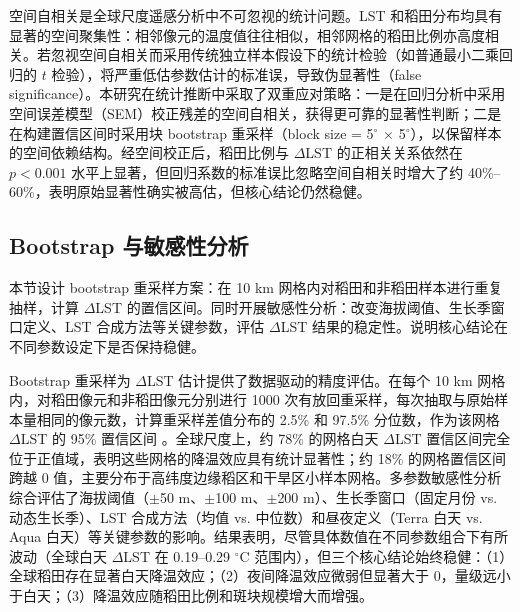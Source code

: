 空间自相关是全球尺度遥感分析中不可忽视的统计问题。LST 和稻田分布均具有显著的空间聚集性：相邻像元的温度值往往相似，相邻网格的稻田比例亦高度相关。若忽视空间自相关而采用传统独立样本假设下的统计检验（如普通最小二乘回归的 $t$ 检验），将严重低估参数估计的标准误，导致伪显著性（false significance）\cite{Weng2025}。本研究在统计推断中采取了双重应对策略：一是在回归分析中采用空间误差模型（SEM）校正残差的空间自相关，获得更可靠的显著性判断；二是在构建置信区间时采用块 bootstrap 重采样（block size = 5$^{\circ}$ $\times$ 5$^{\circ}$），以保留样本的空间依赖结构。经空间校正后，稻田比例与 $\Delta$LST 的正相关关系依然在 $p < 0.001$ 水平上显著，但回归系数的标准误比忽略空间自相关时增大了约 40\%--60\%，表明原始显著性确实被高估，但核心结论仍然稳健。

\subsection{Bootstrap 与敏感性分析}

本节设计 bootstrap 重采样方案：在 10 km 网格内对稻田和非稻田样本进行重复抽样，计算 $\Delta$LST 的置信区间。同时开展敏感性分析：改变海拔阈值、生长季窗口定义、LST 合成方法等关键参数，评估 $\Delta$LST 结果的稳定性。说明核心结论在不同参数设定下是否保持稳健。

Bootstrap 重采样为 $\Delta$LST 估计提供了数据驱动的精度评估。在每个 10 km 网格内，对稻田像元和非稻田像元分别进行 1000 次有放回重采样，每次抽取与原始样本量相同的像元数，计算重采样差值分布的 2.5\% 和 97.5\% 分位数，作为该网格 $\Delta$LST 的 95\% 置信区间 \cite{Weng2025}。全球尺度上，约 78\% 的网格白天 $\Delta$LST 置信区间完全位于正值域，表明这些网格的降温效应具有统计显著性；约 18\% 的网格置信区间跨越 0 值，主要分布于高纬度边缘稻区和干旱区小样本网格。多参数敏感性分析综合评估了海拔阈值（$\pm$50 m、$\pm$100 m、$\pm$200 m）、生长季窗口（固定月份 vs. 动态生长季）、LST 合成方法（均值 vs. 中位数）和昼夜定义（Terra 白天 vs. Aqua 白天）等关键参数的影响。结果表明，尽管具体数值在不同参数组合下有所波动（全球白天 $\Delta$LST 在 0.19--0.29 $^{\circ}\mathrm{C}$ 范围内），但三个核心结论始终稳健：（1）全球稻田存在显著白天降温效应；（2）夜间降温效应微弱但显著大于 0，量级远小于白天；（3）降温效应随稻田比例和斑块规模增大而增强。
